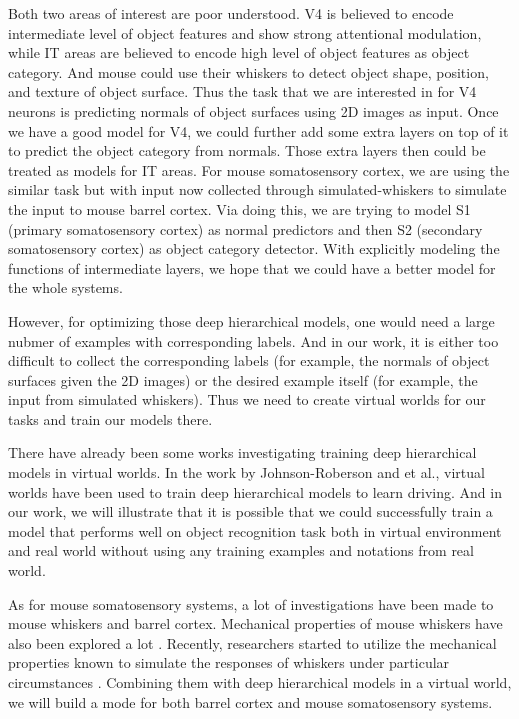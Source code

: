 \documentclass[12pt]{article}
\begin{document}
Both two areas of interest are poor understood. V4 is believed to encode intermediate level of object features and show strong attentional modulation\cite{Roe2012}, while IT areas are believed to encode high level of object features as object category. And mouse could use their whiskers to detect object shape, position, and texture of object surface\cite{Boubenec2012,Diamond2008,Arabzadeh2005,OConnor2010}. Thus the task that we are interested in for V4 neurons is predicting normals of object surfaces using 2D images as input. Once we have a good model for V4, we could further add some extra layers on top of it to predict the object category from normals. Those extra layers then could be treated as models for IT areas. For mouse somatosensory cortex, we are using the similar task but with input now collected through simulated-whiskers to simulate the input to mouse barrel cortex. Via doing this, we are trying to model S1 (primary somatosensory cortex) as normal predictors and then S2 (secondary somatosensory cortex) as object category detector. With explicitly modeling the functions of intermediate layers, we hope that we could have a better model for the whole systems.

However, for optimizing those deep hierarchical models, one would need a large nubmer of examples with corresponding labels. And in our work, it is either too difficult to collect the corresponding labels (for example, the normals of object surfaces given the 2D images) or the desired example itself (for example, the input from simulated whiskers). Thus we need to create virtual worlds for our tasks and train our models there.

There have already been some works investigating training deep hierarchical models in virtual worlds\cite{Qiu2016,Johnson-Roberson2016}. In the work by Johnson-Roberson and et al.\cite{Johnson-Roberson2016}, virtual worlds have been used to train deep hierarchical models to learn driving. And in our work, we will illustrate that it is possible that we could successfully train a model that performs well on object recognition task both in virtual environment and real world without using any training examples and notations from real world.

As for mouse somatosensory systems, a lot of investigations have been made to mouse whiskers and barrel cortex\cite{Boubenec2012,Diamond2008,Arabzadeh2005,OConnor2010}. Mechanical properties of mouse whiskers have also been explored a lot \cite{Diamond2008,Quist2014,Towal2011}. Recently, researchers started to utilize the mechanical properties known to simulate the responses of whiskers under particular circumstances \cite{Huet2016}. Combining them with deep hierarchical models in a virtual world, we will build a mode for both barrel cortex and mouse somatosensory systems.
\end{document}
